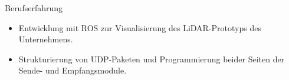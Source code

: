 \begin{rubric}{Berufserfahrung}
\vspace{\CVItemizeHeaderSpacing} \begin{itemize}[leftmargin=*, rightmargin=1cm]
	\setlength{\itemsep}{\CVItemizeSpacing}  
	\item Entwicklung mit ROS zur Visualisierung des LiDAR-Prototyps des Unternehmens.  
	\item Strukturierung von UDP-Paketen und Programmierung beider Seiten der Sende- und Empfangsmodule.  
\end{itemize}
\begin{comment}
%
%
\entry*[] \textbf{Creative Edge LLC} \hfill 08.2017 -- 09.2018 \newline  
 \emph{Softwareentwickler} \hfill Denver, USA \newline  
\vspace{\CVItemizeHeaderSpacing} \begin{itemize}[leftmargin=*, rightmargin=1cm] 
	\setlength{\itemsep}{\CVItemizeSpacing}  
	\item Entwicklung von Anwendungen für das Kryptowährungs-Mining unter Windows und Linux.  
	\item Erstellung von Software zur Verwaltung von Betriebssystemtreibern,  System- ~~~~~~~~~~~~konfigurationen und Tools von Drittanbietern.  
\end{itemize}

\end{comment}
\end{rubric}
